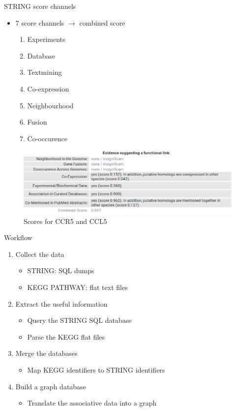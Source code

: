 \documentclass{beamer}
\begin{document}
\begin{frame}{STRING score channels}
    \begin{itemize}
        \item 7 score channels $ \rightarrow $ combined score
        \begin{enumerate}
            \item Experiments
            \item Database
            \item Textmining
            \item Co-expression
            \item Neighbourhood
            \item Fusion
            \item Co-occurence
        \end{enumerate}
    \end{itemize}
    \begin{figure}
        \centering
        \includegraphics[width=0.9\linewidth]{score_channels.png}
        \caption{Scores for CCR5 and CCL5}
    \end{figure}
\end{frame}

\begin{frame}{Workflow}
\begin{enumerate}
    \item Collect the data
    \begin{itemize}
        \item STRING: SQL dumps
        \item KEGG PATHWAY: flat text files
    \end{itemize}
    \vfill
    \item Extract the useful information
    \begin{itemize}
        \item Query the STRING SQL database
        \item Parse the KEGG flat files
    \end{itemize}
    \vfill
    \item Merge the databases
    \begin{itemize}
        \item Map KEGG identifiers to STRING identifiers
    \end{itemize}
    \vfill
    \item  Build a graph database
    \begin{itemize}
        \item Translate the associative data into a graph
    \end{itemize}
\end{enumerate}
\end{frame}
\end{document}
